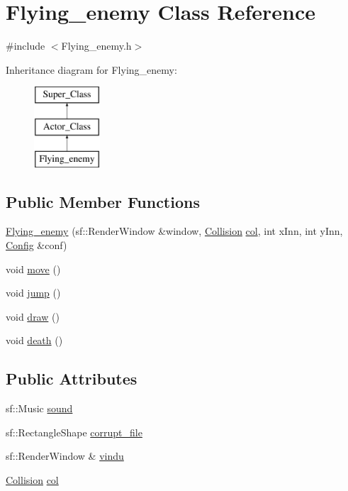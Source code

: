 \hypertarget{class_flying__enemy}{}\section{Flying\+\_\+enemy Class Reference}
\label{class_flying__enemy}


{\ttfamily \#include $<$Flying\+\_\+enemy.\+h$>$}

Inheritance diagram for Flying\+\_\+enemy\+:\begin{figure}[H]
\begin{center}
\leavevmode
\includegraphics[height=3.000000cm]{class_flying__enemy}
\end{center}
\end{figure}
\subsection*{Public Member Functions}
\begin{DoxyCompactItemize}
\item 
\hyperlink{class_flying__enemy_a2421fcde96321136c07dff8ad05f459b}{Flying\+\_\+enemy} (sf\+::\+Render\+Window \&window, \hyperlink{class_collision}{Collision} \hyperlink{class_flying__enemy_a4fc05425448f4272839d9765f5f9e859}{col}, int x\+Inn, int y\+Inn, \hyperlink{class_config}{Config} \&conf)
\item 
void \hyperlink{class_flying__enemy_a0b55c3bf770b7f94fa6892cac47c80bd}{move} ()
\item 
void \hyperlink{class_flying__enemy_af9f8bc6cf140ee0c4ce1f7e340ef79e5}{jump} ()
\item 
void \hyperlink{class_flying__enemy_a2d8bc9f4c82ec045da7346bd3613bfcb}{draw} ()
\item 
void \hyperlink{class_flying__enemy_a79631d3c3cf673c0651be53eac8ac330}{death} ()
\end{DoxyCompactItemize}
\subsection*{Public Attributes}
\begin{DoxyCompactItemize}
\item 
sf\+::\+Music \hyperlink{class_flying__enemy_a4b51b8962f740ad0357420758e19d9c9}{sound}
\item 
sf\+::\+Rectangle\+Shape \hyperlink{class_flying__enemy_a4c36026231ab03d14c8b3429c026c2ad}{corrupt\+\_\+file}
\item 
sf\+::\+Render\+Window \& \hyperlink{class_flying__enemy_a27b52e8aef1f1164bf61e8ef0d16428c}{vindu}
\item 
\hyperlink{class_collision}{Collision} \hyperlink{class_flying__enemy_a4fc05425448f4272839d9765f5f9e859}{col}
\end{DoxyCompactItemize}
